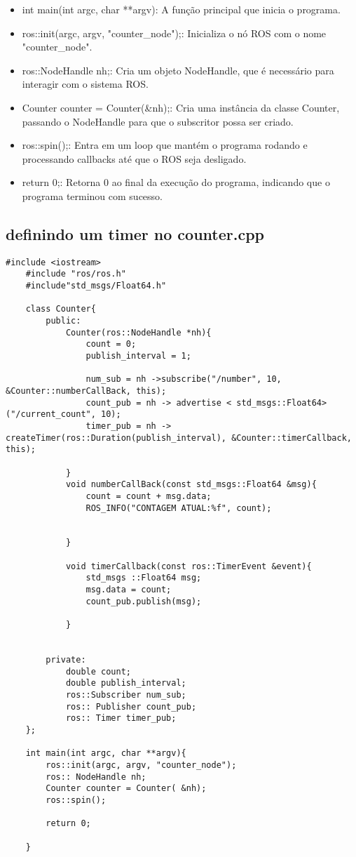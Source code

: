 \documentclass[letterpaper]{article}
\begin{document}
\begin{itemize}
            \item int main(int argc, char **argv): A função principal que inicia o programa.
            \item ros::init(argc, argv, "counter\_node");: Inicializa o nó ROS com o nome "counter\_node".
            \item ros::NodeHandle nh;: Cria um objeto NodeHandle, que é necessário para interagir com o sistema ROS.
            \item Counter counter = Counter(\&nh);: Cria uma instância da classe Counter, passando o NodeHandle para que o subscritor possa ser criado.
            \item ros::spin();: Entra em um loop que mantém o programa rodando e processando callbacks até que o ROS seja desligado.
            \item return 0;: Retorna 0 ao final da execução do programa, indicando que o programa terminou com sucesso.
            
        \end{itemize}
    \subsection{definindo um timer no counter.cpp}
    
    \begin{lstlisting}[style=cppStyle, title= counter.cpp - publicando ]
    #include <iostream>
    #include "ros/ros.h"
    #include"std_msgs/Float64.h"
    
    class Counter{
        public:
            Counter(ros::NodeHandle *nh){
                count = 0;
                publish_interval = 1;
    
                num_sub = nh ->subscribe("/number", 10, &Counter::numberCallBack, this);
                count_pub = nh -> advertise < std_msgs::Float64>("/current_count", 10);
                timer_pub = nh -> createTimer(ros::Duration(publish_interval), &Counter::timerCallback, this);
    
            }
            void numberCallBack(const std_msgs::Float64 &msg){
                count = count + msg.data;
                ROS_INFO("CONTAGEM ATUAL:%f", count); 
    
    
            }
    
            void timerCallback(const ros::TimerEvent &event){
                std_msgs ::Float64 msg;
                msg.data = count;
                count_pub.publish(msg); 
    
            }
    
    
        private:
            double count;
            double publish_interval;
            ros::Subscriber num_sub;
            ros:: Publisher count_pub;
            ros:: Timer timer_pub;
    };
    
    int main(int argc, char **argv){
        ros::init(argc, argv, "counter_node");
        ros:: NodeHandle nh;
        Counter counter = Counter( &nh);
        ros::spin();
    
        return 0;
    
    } 
    \end{lstlisting}
\end{document}
